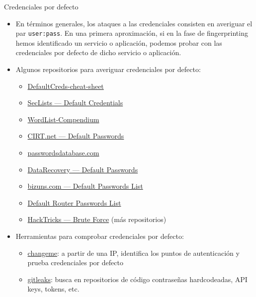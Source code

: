 \documentclass[aspectratio=169,11pt]{beamer}
\newcommand{\cmd}[1]{\texttt{#1}}
\begin{document}
\begin{frame}[allowframebreaks]{Credenciales por defecto}
\small
  \begin{itemize}
  \item En términos generales, los ataques a las credenciales consisten en averiguar el par \cmd{user:pass}. En una primera aproximación, si en la fase de fingerprinting hemos identificado un servicio o aplicación, podemos probar con las credenciales por defecto de dicho servicio o aplicación.
  \item Algunos repositorios para averiguar credenciales por defecto:
    \begin{itemize}
    \item \href{https://github.com/ihebski/DefaultCreds-cheat-sheet}{DefaultCreds-cheat-sheet}
    \item \href{https://github.com/danielmiessler/SecLists/blob/master/Passwords/Default-Credentials/default-passwords.csv}{SecLists --- Default Credentials}
    \item \href{https://github.com/Dormidera/WordList-Compendium}{WordList-Compendium}
    \item \href{https://www.cirt.net/passwords}{CIRT.net --- Default Passwords}
    \item \href{http://www.passwordsdatabase.com/}{passwordsdatabase.com}
    \item \href{https://datarecovery.com/rd/default-passwords/}{DataRecovery --- Default Passwords}
    \item \href{https://bizuns.com/default-passwords-list}{bizuns.com --- Default Passwords List}
    \item \href{https://192-168-1-1ip.mobi/default-router-passwords-list/}{Default Router Passwords List}
    \item \href{https://book.hacktricks.xyz/brute-force}{HackTricks --- Brute Force} (más repositorios)
    \end{itemize}
  \item Herramientas para comprobar credenciales por defecto:
    \begin{itemize}
    \item \href{https://github.com/ztgrace/changeme}{changeme}: a partir de una IP, identifica los puntos de autenticación y prueba credenciales por defecto
    \item \href{https://github.com/zricethezav/gitleaks}{gitleaks}: busca en repositorios de código contraseñas hardcodeadas, API keys, tokens, etc.
    \end{itemize}
  \end{itemize}
\end{frame}
\end{document}
